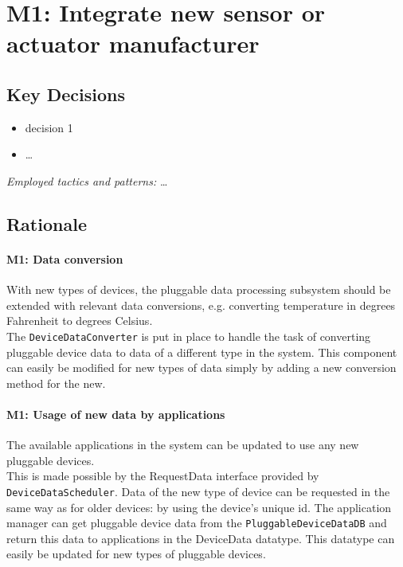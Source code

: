 \section{M1: Integrate new sensor or actuator manufacturer}


    \subsection*{Key Decisions}


    \begin{itemize}
    	\item decision 1
    	\item \ldots
    \end{itemize}
    \emph{Employed tactics and patterns:} \ldots

    \subsection*{Rationale}
        \paragraph{M1: Data conversion}
            With new types of devices, the pluggable data processing subsystem
            should be extended with relevant data conversions,
            e.g. converting temperature in degrees Fahrenheit to degrees Celsius. \\
            The \texttt{DeviceDataConverter} is put in place to handle the
            task of converting pluggable device data to data of a different type in the system.
            This component can easily be modified for new types of data simply by
            adding a new conversion method for the new.

        \paragraph{M1: Usage of new data by applications}
            The available applications in the system can be updated to use any
            new pluggable devices. \\
            This is made possible by the RequestData
            interface provided by \texttt{DeviceDataScheduler}.
            Data of the new type of device can be requested in the same way
            as for older devices: by using the device's unique id.
            The application manager can get pluggable device data from the
            \texttt{PluggableDeviceDataDB} and return this data to applications in
            the DeviceData datatype. This datatype can easily be
            updated for new types of pluggable devices.

